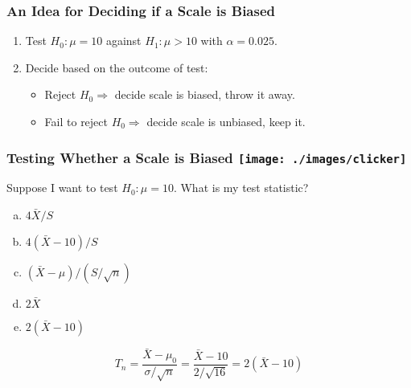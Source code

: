 \begin{frame}
	\frametitle{An Idea for Deciding if a Scale is Biased}

\begin{enumerate}
	\item Test $H_0 \colon \mu = 10$ against $H_1\colon \mu > 10$ with $\alpha =0.025$.
	\item Decide based on the outcome of test:
		\begin{itemize}
	\item Reject $H_0 \Rightarrow$ decide scale is biased, throw it away.
	\item Fail to reject $H_0 \Rightarrow$ decide scale is unbiased, keep it.
			\end{itemize}	
\end{enumerate}

\end{frame}
\begin{frame}[t]
	\frametitle{Testing Whether a Scale is Biased \hfill \texttt{[image: ./images/clicker]}}

	\vspace{2em}

	Suppose I want to test $H_0\colon \mu = 10$. What is my test statistic? 

	\vspace{1em}

	\begin{enumerate}[(a)]
		\item $4\bar{X}/S$  
		\item $4(\bar{X} - 10)/S$
		\item $(\bar{X} - \mu)/(S/\sqrt{n})$
		\item $2 \bar{X}$
		\item $2(\bar{X} - 10)$ 
	\end{enumerate}

	\pause
	\alert{$$T_n = \frac{\bar{X} - \mu_0}{\sigma/\sqrt{n}} = \frac{\bar{X} - 10}{2/\sqrt{16}} = 2(\bar{X} - 10)$$}
\end{frame}

